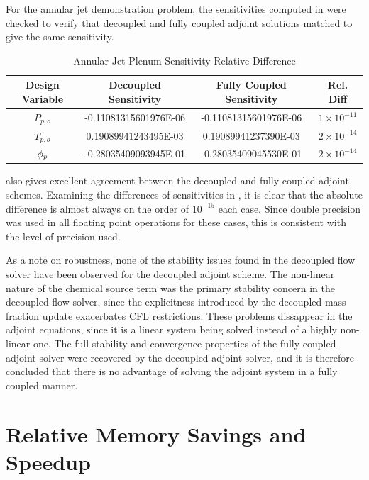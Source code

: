 For the annular jet demonstration problem, the sensitivities computed in
 were checked to verify that decoupled and fully
coupled adjoint solutions matched to give the same sensitivity.
\begin{table}[h]
  \centering
  \begin{tabular}{c|c|c|c}
    Design Variable & Decoupled Sensitivity & Fully Coupled Sensitivity & Rel. Diff\\
    \hline
    $P_{p,o}$ & -0.11081315601976E-06 & -0.11081315601976E-06 & $1 \times 10^{-11}$ \\
    $T_{p,o}$ &  0.19089941243495E-03 &  0.19089941237390E-03 & $2 \times 10^{-14}$ \\
    $\phi_p$     & -0.28035409093945E-01 & -0.28035409045530E-01 & $2 \times 10^{-14}$
  \end{tabular}
  \caption{Annular Jet Plenum Sensitivity Relative Difference}
  \label{tab:srp-adj-diff}
\end{table}
 also gives excellent agreement between the decoupled and
fully coupled adjoint schemes.  Examining the differences of sensitivities in
, it is clear
that the absolute difference is almost always on the order of $10^{-15}$ each
case.  Since double precision was used in all floating point operations for
these cases, this is consistent with the level of precision used.

As a note on robustness, none of the stability issues found in the decoupled
flow solver have been observed for the decoupled adjoint scheme.  The
non-linear nature of the chemical source term was the primary stability concern
in the decoupled flow solver, since the explicitness introduced by the decoupled
mass fraction update exacerbates CFL restrictions.  These problems dissappear in
the adjoint equations, since it is a linear system being solved instead of a
highly non-linear one.  The full stability and convergence properties of the
fully coupled adjoint solver were recovered by the decoupled adjoint solver, and
it is therefore concluded that there is no advantage of solving the adjoint
system in a fully coupled manner.

\section{Relative Memory Savings and Speedup}
\label{sec:adj-cost-mem-savings}

